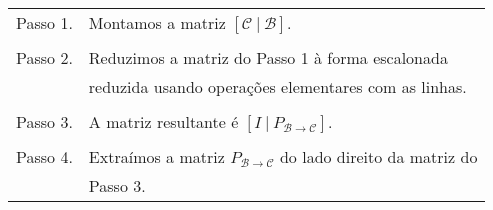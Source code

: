 \documentclass{beamer}
\begin{document}
    \begin{frame}
        \begin{tcolorbox}[colback=green!30, colframe=green!80!blue, title=Procedimento para calcular $P_{\mathcal{B} \to
            \mathcal{C}}$\, no caso de bases de $\real^n$]
            \begin{tabular}{ll}
                Passo 1. & Montamos a matriz $[\mathcal{C}\ |\ \mathcal{B}]$.\pause\\
                \\
                Passo 2. & Reduzimos a matriz do Passo 1 à forma escalonada\\
                & reduzida usando operações elementares com as linhas.\pause\\
                \\
                Passo 3. & A matriz resultante é $[I\ |\ P_{\mathcal{B} \to \mathcal{C}}]$.\pause\\
                \\
                Passo 4. & Extraímos a matriz $P_{\mathcal{B} \to \mathcal{C}}$ do lado direito da matriz do\\
                & Passo 3.
            \end{tabular}
        \end{tcolorbox}
    \end{frame}
\end{document}
